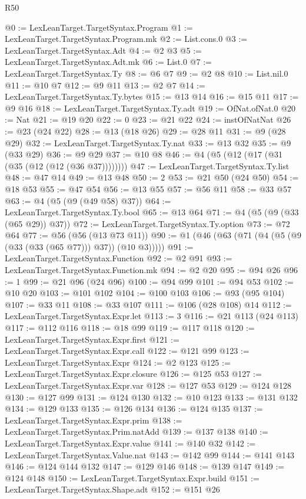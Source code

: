 \begin{lexlean}{R50}
\begin{coremodule}
{{{{{{{{{{{{{{{{{{{{{{{{{{{{{{{{{{{{{{{{{{{{{{{{{{{{{{{{{{{{@0 := LexLeanTarget.TargetSyntax.Program
@1 := LexLeanTarget.TargetSyntax.Program.mk
@2 := List.cons.{0}
@3 := LexLeanTarget.TargetSyntax.Adt
@4 := @2 @3
@5 := LexLeanTarget.TargetSyntax.Adt.mk
@6 := List.{0}
@7 := LexLeanTarget.TargetSyntax.Ty
@8 := @6 @7
@9 := @2 @8
@10 := List.nil.{0}
@11 := @10 @7
@12 := @9 @11
@13 := @2 @7
@14 := LexLeanTarget.TargetSyntax.Ty.bytes
@15 := @13 @14
@16 := @15 @11
@17 := @9 @16
@18 := LexLeanTarget.TargetSyntax.Ty.adt
@19 := OfNat.ofNat.{0}
@20 := Nat
@21 := @19 @20
@22 := 0
@23 := @21 @22
@24 := instOfNatNat
@26 := @23 (@24 @22)
@28 := @13 (@18 @26)
@29 := @28 @11
@31 := @9 (@28 @29)
@32 := LexLeanTarget.TargetSyntax.Ty.nat
@33 := @13 @32
@35 := @9 (@33 @29)
@36 := @9 @29
@37 := @10 @8
@46 := @4 (@5 (@12 (@17 (@31 (@35 (@12 (@12 (@36 @37))))))))
@47 := LexLeanTarget.TargetSyntax.Ty.list
@48 := @47 @14
@49 := @13 @48
@50 := 2
@53 := @21 @50 (@24 @50)
@54 := @18 @53
@55 := @47 @54
@56 := @13 @55
@57 := @56 @11
@58 := @33 @57
@63 := @4 (@5 (@9 (@49 @58) @37))
@64 := LexLeanTarget.TargetSyntax.Ty.bool
@65 := @13 @64
@71 := @4 (@5 (@9 (@33 (@65 @29)) @37))
@72 := LexLeanTarget.TargetSyntax.Ty.option
@73 := @72 @64
@77 := @56 (@56 (@13 @73 @11))
@90 := @1 (@46 (@63 (@71 (@4 (@5 (@9 (@33 (@33 (@65 @77))) @37)) (@10 @3)))))
@91 := LexLeanTarget.TargetSyntax.Function
@92 := @2 @91
@93 := LexLeanTarget.TargetSyntax.Function.mk
@94 := @2 @20
@95 := @94 @26
@96 := 1
@99 := @21 @96 (@24 @96)
@100 := @94 @99
@101 := @94 @53
@102 := @10 @20
@103 := @101 @102
@104 := @100 @103
@106 := @93 (@95 @104)
@107 := @33 @11
@108 := @33 @107
@111 := @106 (@28 @108) @14
@112 := LexLeanTarget.TargetSyntax.Expr.let
@113 := 3
@116 := @21 @113 (@24 @113)
@117 := @112 @116
@118 := @18 @99
@119 := @117 @118
@120 := LexLeanTarget.TargetSyntax.Expr.first
@121 := LexLeanTarget.TargetSyntax.Expr.call
@122 := @121 @99
@123 := LexLeanTarget.TargetSyntax.Expr
@124 := @2 @123
@125 := LexLeanTarget.TargetSyntax.Expr.closure
@126 := @125 @53
@127 := LexLeanTarget.TargetSyntax.Expr.var
@128 := @127 @53
@129 := @124 @128
@130 := @127 @99
@131 := @124 @130
@132 := @10 @123
@133 := @131 @132
@134 := @129 @133
@135 := @126 @134
@136 := @124 @135
@137 := LexLeanTarget.TargetSyntax.Expr.prim
@138 := LexLeanTarget.TargetSyntax.Prim.natAdd
@139 := @137 @138
@140 := LexLeanTarget.TargetSyntax.Expr.value
@141 := @140 @32
@142 := LexLeanTarget.TargetSyntax.Value.nat
@143 := @142 @99
@144 := @141 @143
@146 := @124 @144 @132
@147 := @129 @146
@148 := @139 @147
@149 := @124 @148
@150 := LexLeanTarget.TargetSyntax.Expr.build
@151 := LexLeanTarget.TargetSyntax.Shape.adt
@152 := @151 @26
}}}}}}}}}}}}}}}}}}}}}}}}}}}}}}}}}}}}}}}}}}}}}}}}}}}}}}}}}}}}
\end{coremodule}
\end{lexlean}
